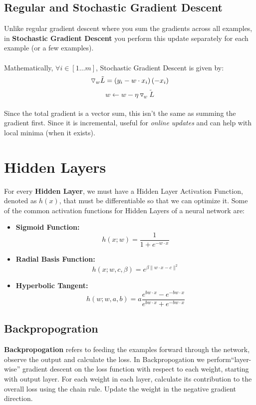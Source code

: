 \documentclass[12pt, a4paper]{book}
\begin{document}
\subsection{Regular and Stochastic Gradient Descent}
Unlike regular gradient descent where you sum the gradients across all examples, in \textbf{Stochastic Gradient Descent} you perform this update separately for each example (or a few examples).\\\\
Mathematically, $\forall i \in [1\ldots m]$, Stochastic Gradient Descent is given by:
$$\triangledown_w\Tilde{L} = \left(y_i - w\cdot x_i\right)(-x_i)$$
$$w \gets w - \eta \triangledown_w\tilde{L}$$\\
Since the total gradient is a vector sum, this isn’t the same as summing the gradient first. Since it is incremental, useful for \textit{online updates} and can help with local minima (when it exists).

\section{Hidden Layers}
For every \textbf{Hidden Layer}, we must have a Hidden Layer Activation Function, denoted as $h(x)$, that must be differentiable so that we can optimize it. Some of the common activation functions for Hidden Layers of a neural network are:
\begin{itemize}
    \item \textbf{Sigmoid Function:}
    $$h(x;w) = \frac{1}{1+e^{-w\cdot x}}$$
    \item \textbf{Radial Basis Function:}
    $$h(x;w,c,\beta) = e^{\beta\|w\cdot x - c\|^2}$$
    \item \textbf{Hyperbolic Tangent:}
    $$h(w;w,a,b) = a\frac{e^{bw\cdot x}-e^{-bw\cdot x}}{e^{bw\cdot x}+e^{-bw\cdot x}}$$
\end{itemize}

\subsection{Backpropogration}
\textbf{Backpropogation} refers to feeding the examples forward through the network, observe the output and calculate the loss. In Backpropogation we perform“layer-wise” gradient descent on the loss function with respect to each weight, starting with output layer. For each weight in each layer, calculate its contribution to the overall loss using the chain rule. Update the weight in the negative gradient direction.
\end{document}
